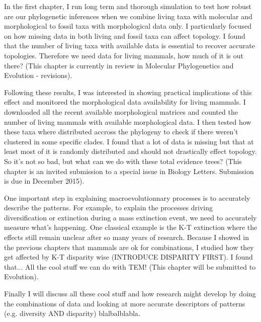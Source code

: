In the first chapter, I run long term and thorough simulation to test how robust are our phylogenetic inferences when we combine living taxa with molecular and morphological to fossil taxa with morphological data only.
I particularly focused on how missing data in both living and fossil taxa can affect topology.
I found that the number of living taxa with available data is essential to recover accurate topologies.
Therefore we need data for living mammals, how much of it is out there?
(This chapter is currently in review in Molecular Phylogenetics and Evolution - revisions).

Following these results, I was interested in showing practical implications of this effect and monitored the morphological data availability for living mammals.
I downloaded all the recent available morphological matrices and counted the number of living mammals with available morphological data.
I then tested how these taxa where distributed accross the phylogeny to check if there weren't clustered in some specific clades.
I found that a lot of data is missing but that at least most of it is randomly distributed and should not drastically effect topology.
So it's not so bad, but what can we do with these total evidence trees?
(This chapter is an invited submission to a special issue in Biology Letters. Submission is due in December 2015).

One important step in explaining macroevolutionnary processes is to accurately describe the patterns.
For example, to explain the processes driving diversification or extinction during a mass extinction event, we need to accurately measure what's happening.
One classical example is the K-T extinction where the effects still remain unclear after so many years of research.
Because I showed in the previous chapters that mammals are ok for combinations, I studied how they get affected by K-T disparity wise (INTRODUCE DISPARITY FIRST).
I found that...
All the cool stuff we can do with TEM!
(This chapter will be submitted to Evolution).

Finally I will discuss all these cool stuff and how research might develop by doing the combinations of data and looking at more accurate descriptors of patterns (e.g. diversity AND disparity) blalbalblabla.

